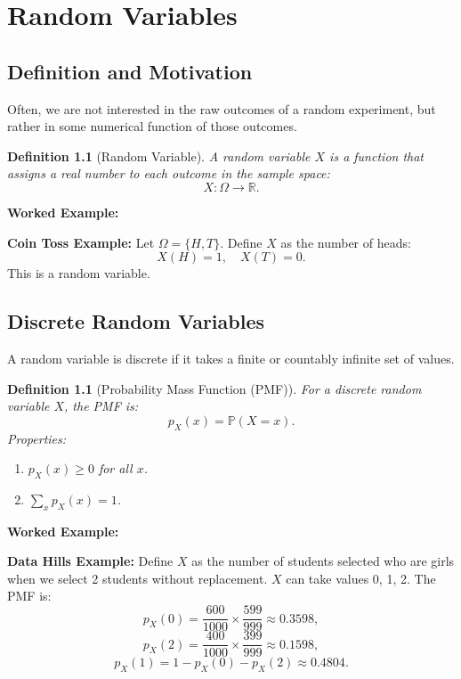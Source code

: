 \documentclass[12pt,a4paper,oneside]{report}
\theoremstyle{mytheorem}
\theoremstyle{mydefinition}
\newtheorem{definition}[theorem]{Definition}
\theoremstyle{myremark}
\newenvironment{worked}{%
  \par\medskip\noindent\textbf{\color{myorange}Worked Example:}\par\smallskip
}{%
  \par\medskip
}
\newcommand{\Prob}{\mathbb{P}}
\begin{document}
\chapter{Random Variables}

\section{Definition and Motivation}
Often, we are not interested in the raw outcomes of a random experiment, but rather in some numerical function of those outcomes.

\begin{definition}[Random Variable]
A random variable $X$ is a function that assigns a real number to each outcome in the sample space:
\[
X: \Omega \to \mathbb{R}.
\]
\end{definition}

\begin{worked}
\textbf{Coin Toss Example:}
Let $\Omega = \{H, T\}$. Define $X$ as the number of heads:
\[
X(H) = 1, \quad X(T) = 0.
\]
This is a random variable.
\end{worked}

\section{Discrete Random Variables}
A random variable is discrete if it takes a finite or countably infinite set of values.

\begin{definition}[Probability Mass Function (PMF)]
For a discrete random variable $X$, the PMF is:
\[
p_X(x) = \Prob(X = x).
\]
Properties:
\begin{enumerate}
    \item $p_X(x) \ge 0$ for all $x$.
    \item $\sum_{x} p_X(x) = 1$.
\end{enumerate}
\end{definition}

\begin{worked}
\textbf{Data Hills Example:}
Define $X$ as the number of students selected who are girls when we select 2 students without replacement.
$X$ can take values 0, 1, 2.
The PMF is:
\[
p_X(0) = \frac{600}{1000} \times \frac{599}{999} \approx 0.3598,
\]
\[
p_X(2) = \frac{400}{1000} \times \frac{399}{999} \approx 0.1598,
\]
\[
p_X(1) = 1 - p_X(0) - p_X(2) \approx 0.4804.
\]
\end{worked}
\end{document}
